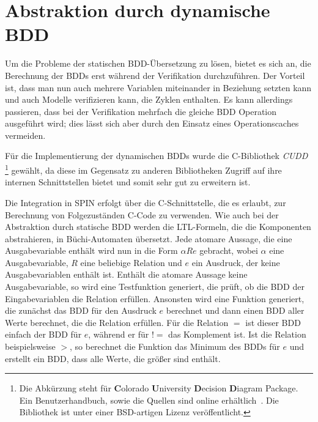 \section{Abstraktion durch dynamische BDD}
Um die Probleme der statischen BDD-Übersetzung zu lösen, bietet es sich an, die Berechnung der BDDs erst während der Verifikation durchzuführen.
Der Vorteil ist, dass man nun auch mehrere Variablen miteinander in Beziehung setzten kann und auch Modelle verifizieren kann, die Zyklen enthalten.
Es kann allerdings passieren, dass bei der Verifikation mehrfach die gleiche BDD Operation ausgeführt wird; dies lässt sich aber durch den Einsatz eines Operationscaches vermeiden.

Für die Implementierung der dynamischen BDDs wurde die C-Bibliothek \emph{CUDD}
\footnote{Die Abkürzung steht für {\bf C}olorado {\bf U}niversity {\bf D}ecision {\bf D}iagram Package.
  Ein Benutzerhandbuch, sowie die Quellen sind online erhältlich~\cite{cudd}.
  Die Bibliothek ist unter einer BSD-artigen Lizenz veröffentlicht.
}
gewählt, da diese im Gegensatz zu anderen Bibliotheken Zugriff auf ihre internen Schnittstellen bietet und somit sehr gut zu erweitern ist.

Die Integration in SPIN erfolgt über die C-Schnittstelle, die es erlaubt, zur Berechnung von Folgezuständen C-Code zu verwenden.
Wie auch bei der Abstraktion durch statische BDD werden die LTL-Formeln, die die Komponenten abstrahieren, in Büchi-Automaten übersetzt.
Jede atomare Aussage, die eine Ausgabevariable enthält wird nun in die Form $\alpha R e$ gebracht, wobei $\alpha$ eine Ausgabevariable, $R$ eine beliebige Relation und $e$ ein Ausdruck, der keine Ausgabevariablen enthält ist.
Enthält die atomare Aussage keine Ausgabevariable, so wird eine Testfunktion generiert, die prüft, ob die BDD der Eingabevariablen die Relation erfüllen.
Ansonsten wird eine Funktion generiert, die zunächst das BDD für den Ausdruck $e$ berechnet und dann einen BDD aller Werte berechnet, die die Relation erfüllen.
Für die Relation $=$ ist dieser BDD einfach der BDD für $e$, während er für $!=$ das Komplement ist.
Ist die Relation beispielsweise $>$, so berechnet die Funktion das Minimum des BDDs für $e$ und erstellt ein BDD, dass alle Werte, die größer sind enthält.
